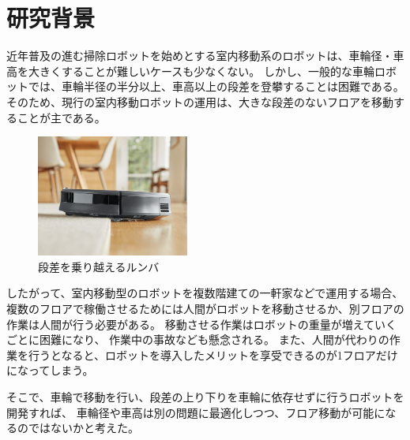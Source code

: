 \documentclass[dvipdfmx]{jsarticle}
\begin{document}

\section{研究背景}
近年普及の進む掃除ロボットを始めとする室内移動系のロボットは、車輪径・車高を大きくすることが難しいケースも少なくない。
しかし、一般的な車輪ロボットでは、車輪半径の半分以上、車高以上の段差を登攀することは困難である。
そのため、現行の室内移動ロボットの運用は、大きな段差のないフロアを移動することが主である。
\begin{figure}[H]
  \centering
  \includegraphics[width=50mm]{image/roomba.png}
  \caption{段差を乗り越えるルンバ}
  \label{fig:runba}
\end{figure}
したがって、室内移動型のロボットを複数階建ての一軒家などで運用する場合、
複数のフロアで稼働させるためには人間がロボットを移動させるか、別フロアの作業は人間が行う必要がある。
移動させる作業はロボットの重量が増えていくごとに困難になり、
作業中の事故なども懸念される。
また、人間が代わりの作業を行うとなると、ロボットを導入したメリットを享受できるのが1フロアだけになってしまう。

そこで、車輪で移動を行い、段差の上り下りを車輪に依存せずに行うロボットを開発すれば、
車輪径や車高は別の問題に最適化しつつ、フロア移動が可能になるのではないかと考えた。
\end{document}
